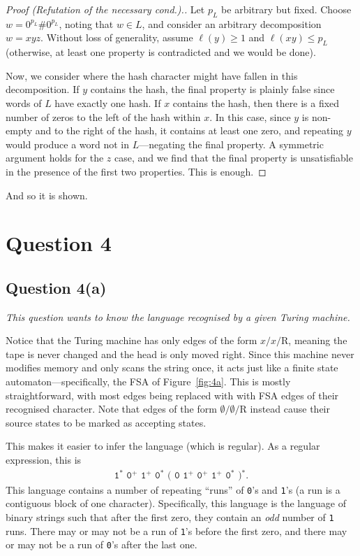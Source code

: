 \documentclass[a4paper]{article}
\begin{document}
\begin{proof}[Proof \textrm{(Refutation of the necessary cond.)}.]
Let $p_L$ be arbitrary but fixed.
Choose $w = 0^{p_L}\#0^{p_L}$, noting that $w \in L$, and consider an arbitrary decomposition $w=xyz$.
Without loss of generality, assume $\ell(y) \ge 1$ and $\ell(xy) \le p_L$ (otherwise, at least one property is contradicted and we would be done).

Now, we consider where the hash character might have fallen in this decomposition.
If $y$ contains the hash, the final property is plainly false since words of $L$ have exactly one hash.
If $x$ contains the hash, then there is a fixed number of zeros to the left of the hash within $x$.
In this case, since $y$ is non-empty and to the right of the hash,
it contains at least one zero, and repeating $y$ would produce a word not in
$L$---negating the final property.
A symmetric argument holds for the $z$ case, and
we find that the final property is unsatisfiable in the presence of the first two properties.
This is enough.
\end{proof}

\noindent And so it is shown.



\newpage
\section*{Question 4}
\subsection*{Question 4(a)}
\begin{center}
  \textit{
    This question wants to know the language recognised by a given Turing machine.
  }
\end{center}
Notice that the Turing machine has only edges of the form $x/x/\mathrm R$,
meaning the tape is never changed and the head is only moved right.
Since this machine never modifies memory and only scans the string once,
it acts just like a finite state automaton---specifically,
the FSA of Figure~\ref{fig:4a}.
This is mostly straightforward, with most edges being replaced with
with FSA edges of their recognised character.
Note that edges of the form $\emptyset/\emptyset/\mathrm R$
instead cause their source states to be marked as accepting states.

This makes it easier to infer the language (which is regular).
As a regular expression, this is
\begin{align*}
  \texttt{1$^*$ 0$^+$ 1$^+$ 0$^*$ ( 0 1$^+$ 0$^+$ 1$^+$ 0$^*$ )$^*$}.
\end{align*}
This language contains a number of repeating ``runs'' of 
\texttt{0}'s and \texttt{1}'s (a run is a contiguous block of one character).
Specifically, this language is the language of binary strings such that
after the first zero, they contain an \textit{odd} number of \texttt 1 runs.
There may or may not be a run of \texttt 1's before the first zero,
and there may or may not be a run of \texttt 0's after the last one.
\end{document}
